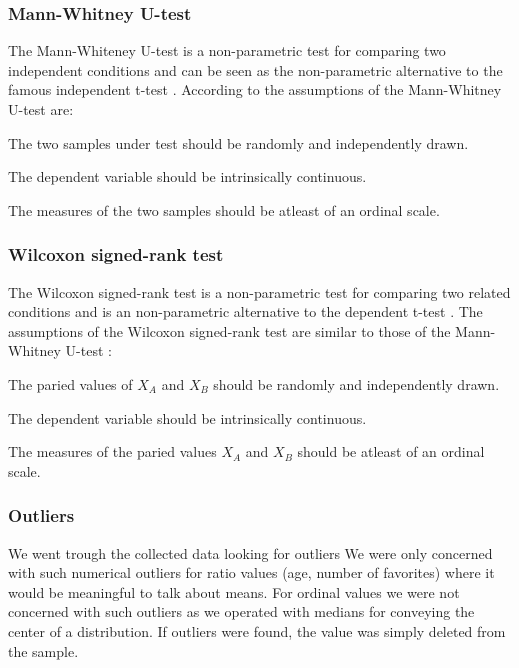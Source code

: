 \subsubsection{Mann-Whitney U-test}

The Mann-Whiteney U-test is a non-parametric test for comparing two
independent conditions and can be seen as the non-parametric alternative to
the famous independent t-test \citep[]{field05}.
According to \citet[]{lowry08} the assumptions of the
Mann-Whitney U-test are:

\begin{enum}
  \item The two samples under test should be randomly and independently drawn.
  \item The dependent variable should be intrinsically continuous.
  \item The measures of the two samples should be atleast of an ordinal scale.
\end{enum}

\subsubsection{Wilcoxon signed-rank test}

The Wilcoxon signed-rank test is a non-parametric test for comparing two
related conditions and is an non-parametric alternative to the
dependent t-test \citep[]{field05}.
The assumptions of the Wilcoxon signed-rank test are similar to those
of the Mann-Whitney U-test \citep[]{lowry08}:

\begin{enum}
  \item The paried values of $X_A$ and $X_B$
    should be randomly and independently drawn.
  \item The dependent variable should be intrinsically continuous.
  \item The measures of the paried values $X_A$ and $X_B$
    should be atleast of an ordinal scale.
\end{enum}


\subsubsection{Outliers}

We went trough the collected data looking for outliers
\dash{}
We were only concerned with such numerical outliers for ratio values
(age, number of favorites) where it would be meaningful to talk about means.
For ordinal values we were not concerned with such outliers as we operated
with medians for conveying the center of a distribution.
If outliers were found, the value was simply deleted from the sample.


